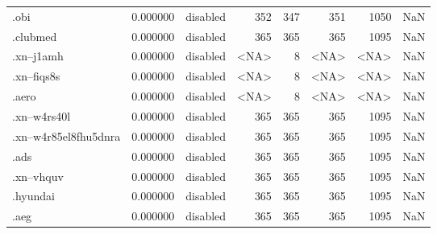 \begin{tabular}{lrlrrrrl}
.obi                      &          0.000000 &        disabled &                         352 &                         347 &                         351 &                1050 &                  NaN \\
.clubmed                  &          0.000000 &        disabled &                         365 &                         365 &                         365 &                1095 &                  NaN \\
.xn--j1amh                &          0.000000 &        disabled &                        <NA> &                           8 &                        <NA> &                <NA> &                  NaN \\
.xn--fiqs8s               &          0.000000 &        disabled &                        <NA> &                           8 &                        <NA> &                <NA> &                  NaN \\
.aero                     &          0.000000 &        disabled &                        <NA> &                           8 &                        <NA> &                <NA> &                  NaN \\
.xn--w4rs40l              &          0.000000 &        disabled &                         365 &                         365 &                         365 &                1095 &                  NaN \\
.xn--w4r85el8fhu5dnra     &          0.000000 &        disabled &                         365 &                         365 &                         365 &                1095 &                  NaN \\
.ads                      &          0.000000 &        disabled &                         365 &                         365 &                         365 &                1095 &                  NaN \\
.xn--vhquv                &          0.000000 &        disabled &                         365 &                         365 &                         365 &                1095 &                  NaN \\
.hyundai                  &          0.000000 &        disabled &                         365 &                         365 &                         365 &                1095 &                  NaN \\
.aeg                      &          0.000000 &        disabled &                         365 &                         365 &                         365 &                1095 &                  NaN \\

\end{tabular}
